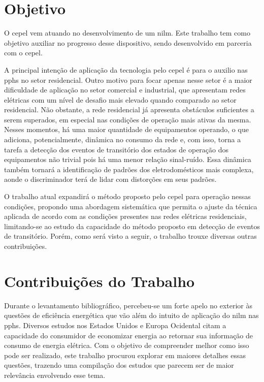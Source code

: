 \section{Objetivo}

O \acs{cepel} vem atuando no desenvolvimento de um \acs{nilm}. Este
trabalho tem como objetivo auxiliar no progresso desse dispositivo,
sendo desenvolvido em parceria com o \acs{cepel}.

A principal intenção de aplicação da tecnologia pelo \acs{cepel} é
para o auxilio nas \glspl{pph} no setor residencial. Outro motivo para
focar apenas nesse setor é a maior dificuldade de aplicação no setor
comercial e industrial, que apresentam redes elétricas com um nível de
desafio mais elevado quando comparado ao setor residencial. Não
obstante, a rede residencial já apresenta obstáculos suficientes a
serem superados, em especial nas condições de operação mais ativas da
mesma. Nesses momentos, há uma maior quantidade de equipamentos
operando, o que adiciona, potencialmente, dinâmica no consumo da rede
e, com isso, torna a tarefa a detecção dos eventos de transitório
dos estados de operação dos equipamentos não trivial pois há uma menor
relação sinal-ruído. Essa dinâmica também tornará a identificação de
padrões dos eletrodomésticos mais complexa, aonde o discriminador terá
de lidar com distorções em seus padrões.

O trabalho atual expandirá o método proposto pelo \acs{cepel}
para operação nessas condições, propondo uma abordagem sistemática que
permita o ajuste da técnica aplicada de acordo com as condições
presentes nas redes elétricas residenciais, limitando-se ao estudo da
capacidade do método proposto em detecção de eventos de
transitório. Porém, como será visto a seguir, o trabalho trouxe
diversas outras contribuições.

\section{Contribuições do Trabalho}

Durante o levantamento bibliográfico, percebeu-se um forte apelo no
exterior às questões de eficiência energética que vão além do intuito
de aplicação do \acs{nilm} nas \glspl{pph}. Diversos estudos nos
Estados Unidos e Europa Ocidental citam a capacidade do consumidor de
economizar energia ao retornar sua informação de consumo de energia
elétrica. Com o objetivo de compreender melhor como isso pode ser
realizado, este trabalho procurou explorar em maiores detalhes essas
questões, trazendo uma compilação dos estudos que parecem ser de maior
relevância envolvendo esse tema.

